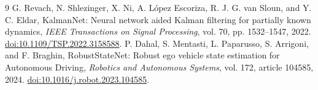 ﻿\documentclass[10pt,a4paper]{article}
\begin{document}
\begin{thebibliography}{9}
G. Revach, N. Shlezinger, X. Ni, A. L\'opez Escoriza,
R. J. G. van Sloun, and Y. C. Eldar,
KalmanNet: Neural network aided Kalman filtering for partially known dynamics,
\emph{IEEE Transactions on Signal Processing}, vol. 70, pp. 1532--1547, 2022.
\href{https://doi.org/10.1109/TSP.2022.3158588}{doi:10.1109/TSP.2022.3158588}.
P. Dahal, S. Mentasti, L. Paparusso, S. Arrigoni, and F. Braghin,
RobustStateNet: Robust ego vehicle state estimation for Autonomous Driving,
\emph{Robotics and Autonomous Systems}, vol. 172, article 104585, 2024.
\href{https://doi.org/10.1016/j.robot.2023.104585}{doi:10.1016/j.robot.2023.104585}.
\end{thebibliography}
\end{document}
